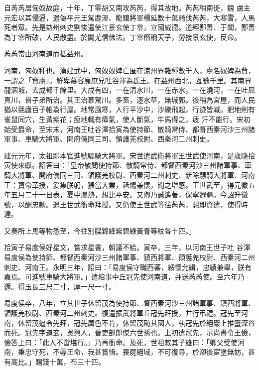 \begin{pinyinscope}
 自芮芮居匈奴故庭，十年，丁零胡又南攻芮芮，得其故地。芮芮稍南徙，魏
 虜主元宏以其侵逼，遣偽平元王駕鹿渾、龍驤將軍楊延數十萬騎伐芮芮，大寒雪，人馬死者眾。先是益州刺史劉悛遣使江景玄使丁零，宣國威德。道經鄯善、于闐，鄯善為丁零所破，人民散盡。於闐尤信佛法。丁零僭稱天子，勞接景玄使，反命。



 芮芮常由河南道而抵益州。



 河南，匈奴種也。漢建武中，匈奴奴婢亡匿在涼州界雜種數千人，虜名奴婢為貲，一謂之「貲虜」。鮮卑慕容廆庶兄吐谷渾為氐王。在益州西北，亙數千里。其南界龍涸城，去成都千餘里。大戍有四，一在清水川，一在赤水，一在澆河，一在吐屈真川，皆子弟所治。其王治慕駕川。多畜，逐水草，無城郭。後稍為宮屋，而人民猶以氈廬百子帳為行屋。地常風寒，人行平沙中，沙礫飛起，行迹皆滅。肥地則有雀鼠同穴，生黃紫花；瘦地輒有瘴氣，使人斷氣，牛馬得之，疲
 汗不能行。宋初始受爵命，至宋末，河南王吐谷渾拾寅為使持節、散騎常侍、都督西秦河沙三州諸軍事、車騎大將軍、開府儀同三司、領護羌校尉、西秦河二州刺史。



 建元元年，太祖即本官進號驃騎大將軍。宋世遣武衛將軍王世武使河南，是歲隨拾寅使來獻。詔答曰：「皇帝敬問使持節、散騎常侍、都督西秦河沙三州諸軍事、車騎大將軍、開府儀同三司、領護羌校尉、西秦河二州刺史、新除驃騎大將軍、河南王：寶命革授，爰集朕躬，猥當大業，祗惕兼懷，聞之增感。王世武至，得元徽五年五月二十一日表，夏中濕熱，想比平安。又卿乃誠遙著，保寧遐疆。今詔升徽號，以酬忠款。遣王世武銜命拜授。又仍使王世武等往芮芮，想即資遣，使得時達。



 又奏所上馬等物悉至，今往別牒錦絳紫碧綠黃青等紋各十匹。」



 拾寅子易度侯好星文，嘗求星書，朝議不給。寅卒，三年，以河南王世子吐
 谷渾易度侯為使持節、都督西秦河沙三州諸軍事、鎮西將軍、領護羌校尉、西秦河二州刺史、河南王。永明三年，詔曰：「易度侯守職西蕃，綏懷允緝，忠績兼舉，朕有嘉焉。可進號車騎大將軍。」遣給事中丘冠先使河南道，并送芮芮使。至六年乃還。得玉長三尺二寸，厚一尺一寸。



 易度侯卒，八年，立其世子休留茂為使持節、督西秦河沙三州諸軍事、鎮西將軍、領護羌校尉、西秦河二州刺史。復遣振武將軍丘冠先拜授，并行弔禮。冠先至河南，休留茂逼令先拜，冠先厲色不肯，休留茂恥其國人，執冠先於絕巖上推墮深谷而死。冠先字道玄，吳興人，晉吏部郎傑六世孫也。上初遣冠先，示尚書令王儉，儉答上曰：「此人不啻堪行。」乃再銜命。及死，世祖敕其子雄曰：「卿父受使河南，秉忠守死，不辱王命，我甚賞惜。喪屍絕域，不可復尋，於卿後宦塗無妨，甚有高比。」賜錢十萬，布三十匹。




\end{pinyinscope}

